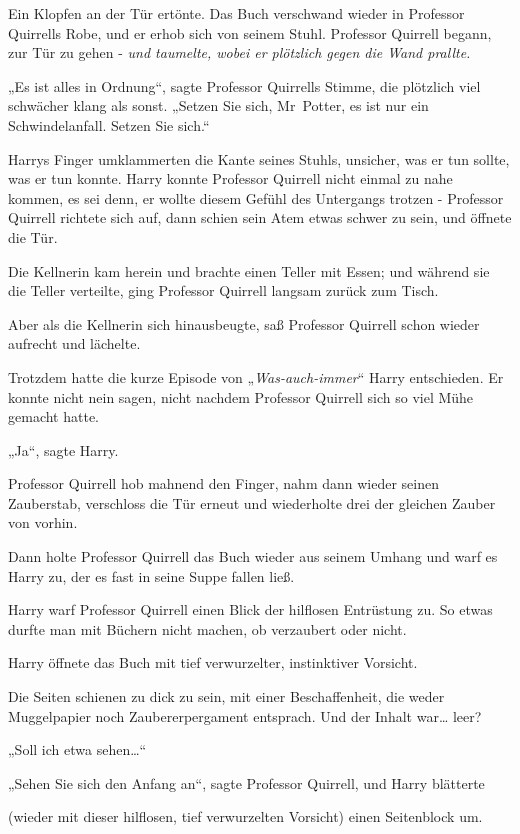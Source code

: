 {Ein Klopfen an der Tür ertönte. Das Buch verschwand wieder in Professor Quirrells Robe, und er erhob sich von seinem Stuhl. Professor Quirrell begann, zur Tür zu gehen - \emph{und taumelte, wobei er plötzlich gegen die Wand prallte.}

„Es ist alles in Ordnung“, sagte Professor Quirrells Stimme, die plötzlich viel schwächer klang als sonst. „Setzen Sie sich, Mr~Potter, es ist nur ein Schwindelanfall. Setzen Sie sich.“

Harrys Finger umklammerten die Kante seines Stuhls, unsicher, was er tun sollte, was er tun konnte. Harry konnte Professor Quirrell nicht einmal zu nahe kommen, es sei denn, er wollte diesem Gefühl des Untergangs trotzen - Professor Quirrell richtete sich auf, dann schien sein Atem etwas schwer zu sein, und öffnete die Tür.

Die Kellnerin kam herein und brachte einen Teller mit Essen; und während sie die Teller verteilte, ging Professor Quirrell langsam zurück zum Tisch.

Aber als die Kellnerin sich hinausbeugte, saß Professor Quirrell schon wieder aufrecht und lächelte.

Trotzdem hatte die kurze Episode von „\emph{Was-auch-immer}“ Harry entschieden. Er konnte nicht nein sagen, nicht nachdem Professor Quirrell sich so viel Mühe gemacht hatte.

„Ja“, sagte Harry.

Professor Quirrell hob mahnend den Finger, nahm dann wieder seinen Zauberstab, verschloss die Tür erneut und wiederholte drei der gleichen Zauber von vorhin.

Dann holte Professor Quirrell das Buch wieder aus seinem Umhang und warf es Harry zu, der es fast in seine Suppe fallen ließ.

Harry warf Professor Quirrell einen Blick der hilflosen Entrüstung zu. So etwas durfte man mit Büchern nicht machen, ob verzaubert oder nicht.

Harry öffnete das Buch mit tief verwurzelter, instinktiver Vorsicht.

Die Seiten schienen zu dick zu sein, mit einer Beschaffenheit, die weder Muggelpapier noch Zaubererpergament entsprach. Und der Inhalt war… leer?

„Soll ich etwa sehen…“

„Sehen Sie sich den Anfang an“, sagte Professor Quirrell, und Harry blätterte

(wieder mit dieser hilflosen, tief verwurzelten Vorsicht) einen Seitenblock um.

}
